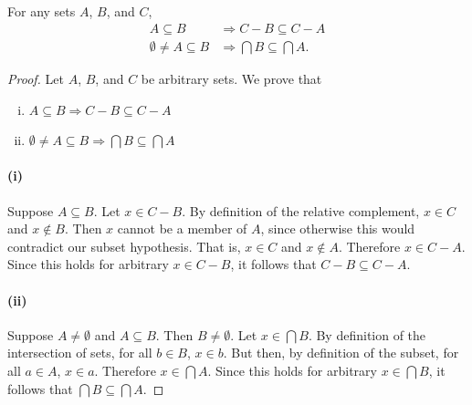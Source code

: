 \documentclass{report}
\begin{document}
\subsection{}%
\label{sub:anti-monotonicity}

For any sets $A$, $B$, and $C$,
  \begin{align*}
    A \subseteq B & \Rightarrow C - B \subseteq C - A \\
    \emptyset \neq A \subseteq B & \Rightarrow \bigcap B \subseteq \bigcap A.
  \end{align*}

\begin{proof}

  \statementpadding



  \noindent Let $A$, $B$, and $C$ be arbitrary sets.
  We prove that
    \begin{enumerate}[(i)]
      \item $A \subseteq B \Rightarrow C - B \subseteq C - A$
      \item $\emptyset \neq A \subseteq B \Rightarrow
             \bigcap B \subseteq \bigcap A$
    \end{enumerate}

  \paragraph{(i)}%

    Suppose $A \subseteq B$.
    Let $x \in C - B$.
    By definition of the relative complement, $x \in C$ and $x \not\in B$.
    Then $x$ cannot be a member of $A$, since otherwise this would contradict
      our subset hypothesis.
    That is, $x \in C$ and $x \not\in A$.
    Therefore $x \in C - A$.
    Since this holds for arbitrary $x \in C - B$, it follows that
      $C - B \subseteq C - A$.

  \paragraph{(ii)}%

    Suppose $A \neq \emptyset$ and $A \subseteq B$.
    Then $B \neq \emptyset$.
    Let $x \in \bigcap B$.
    By definition of the intersection of sets, for all $b \in B$, $x \in b$.
    But then, by definition of the subset, for all $a \in A$, $x \in a$.
    Therefore $x \in \bigcap A$.
    Since this holds for arbitrary $x \in \bigcap B$, it follows that
      $\bigcap B \subseteq \bigcap A$.

\end{proof}
\end{document}
